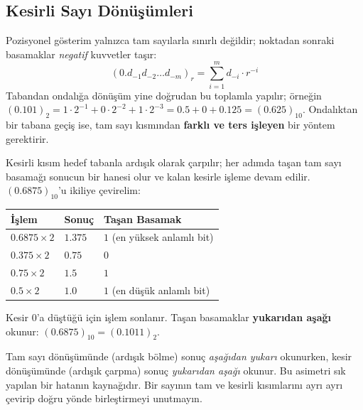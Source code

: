 \subsection{Kesirli Sayı Dönüşümleri}
\label{sec:kesirli-donusum}

Pozisyonel gösterim yalnızca tam sayılarla sınırlı değildir; noktadan sonraki basamaklar
\emph{negatif} kuvvetler taşır:
\[
(0.d_{-1}d_{-2}\ldots d_{-m})_r = \sum_{i=1}^{m} d_{-i}\cdot r^{-i}
\]
Tabandan ondalığa dönüşüm yine doğrudan bu toplamla yapılır; örneğin
$(0.101)_2 = 1\cdot2^{-1}+0\cdot2^{-2}+1\cdot2^{-3} = 0.5+0+0.125 = (0.625)_{10}$. Ondalıktan
bir tabana geçiş ise, tam sayı kısmından \textbf{farklı ve ters işleyen} bir yöntem gerektirir.

\begin{ornek}
Kesirli kısım hedef tabanla ardışık olarak çarpılır; her adımda taşan tam sayı basamağı
sonucun bir hanesi olur ve kalan kesirle işleme devam edilir. $(0.6875)_{10}$'u ikiliye
çevirelim:
\begin{center}
\begin{tabular}{lll}
\toprule
İşlem & Sonuç & Taşan Basamak \\
\midrule
$0.6875\times2$ & $1.375$ & $1$ (en yüksek anlamlı bit) \\
$0.375\times2$ & $0.75$ & $0$ \\
$0.75\times2$ & $1.5$ & $1$ \\
$0.5\times2$ & $1.0$ & $1$ (en düşük anlamlı bit) \\
\bottomrule
\end{tabular}
\end{center}
Kesir $0$'a düştüğü için işlem sonlanır. Taşan basamaklar \textbf{yukarıdan aşağı} okunur:
$(0.6875)_{10} = (0.1011)_2$.
\end{ornek}

\begin{bilginot}
Tam sayı dönüşümünde (ardışık bölme) sonuç \emph{aşağıdan yukarı} okunurken, kesir
dönüşümünde (ardışık çarpma) sonuç \emph{yukarıdan aşağı} okunur. Bu asimetri sık yapılan
bir hatanın kaynağıdır. Bir sayının tam ve kesirli kısımlarını ayrı ayrı çevirip doğru
yönde birleştirmeyi unutmayın.
\end{bilginot}

